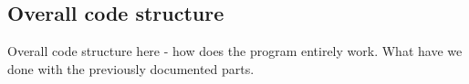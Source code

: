 \documentclass[../report.tex]{subfiles}
\begin{document}
\subsection{Overall code structure}
Overall code structure here - how does the program entirely work. What have we done with the 
previously documented parts.
\end{document}
